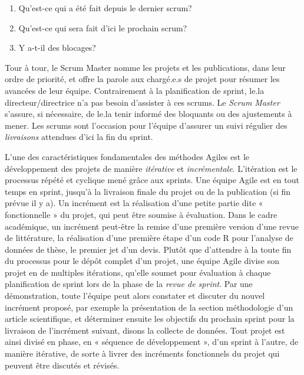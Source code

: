 \documentclass[
  letterpaper,
  DIV=11,
  numbers=noendperiod]{scrreprt}
\providecommand{\tightlist}{%
  \setlength{\itemsep}{0pt}\setlength{\parskip}{0pt}}\usepackage{longtable,booktabs,array}
\begin{document}
\begin{enumerate}
\def\labelenumi{\arabic{enumi}.}
\tightlist
\item
  Qu'est-ce qui a été fait depuis le dernier scrum?
\item
  Qu'est-ce qui sera fait d'ici le prochain scrum?
\item
  Y a-t-il des blocages?
\end{enumerate}

Tour à tour, le Scrum Master nomme les projets et les publications, dans
leur ordre de priorité, et offre la parole aux chargé.e.s de projet pour
résumer les avancées de leur équipe. Contrairement à la planification de
sprint, le.la directeur/directrice n'a pas besoin d'assister à ces
scrums. Le \emph{Scrum Master} s'assure, si nécessaire, de le.la tenir
informé des bloquants ou des ajustements à mener. Les scrums sont
l'occasion pour l'équipe d'assurer un suivi régulier des
\emph{livraisons} attendues d'ici la fin du sprint.

L'une des caractéristiques fondamentales des méthodes Agiles est le
développement des projets de manière \emph{itérative} et
\emph{incrémentale}. L'itération est le processus répété et cyclique
mené grâce aux sprints. Une équipe Agile est en tout temps en sprint,
jusqu'à la livraison finale du projet ou de la publication (si fin
prévue il y a). Un incrément est la réalisation d'une petite partie dite
« fonctionnelle » du projet, qui peut être soumise à évaluation. Dans le
cadre académique, un incrément peut-être la remise d'une première
version d'une revue de littérature, la réalisation d'une première étape
d'un code R pour l'analyse de données de thèse, le premier jet d'un
devis. Plutôt que d'attendre à la toute fin du processus pour le dépôt
complet d'un projet, une équipe Agile divise son projet en de multiples
itérations, qu'elle soumet pour évaluation à chaque planification de
sprint lors de la phase de la \emph{revue de sprint}. Par une
démonstration, toute l'équipe peut alors constater et discuter du nouvel
incrément proposé, par exemple la présentation de la section
méthodologie d'un article scientifique, et déterminer ensuite les
objectifs du prochain sprint pour la livraison de l'incrément suivant,
disons la collecte de données. Tout projet est ainsi divisé en phase, en
« séquence de développement », d'un sprint à l'autre, de manière
itérative, de sorte à livrer des incréments fonctionnels du projet qui
peuvent être discutés et révisés.
\end{document}
